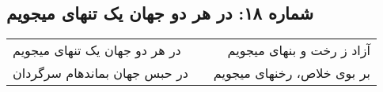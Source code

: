 \begin{center}
\section*{شماره ۱۸: در هر دو جهان یک تنهای میجویم}
\label{sec:018}
\begin{longtable}{l p{0.5cm} r}
در هر دو جهان یک تنهای میجویم
&&
آزاد ز رخت و بنهای میجویم
\\
در حبس جهان بماندهام سرگردان
&&
بر بوی خلاص، رخنهای میجویم
\\
\end{longtable}
\end{center}
